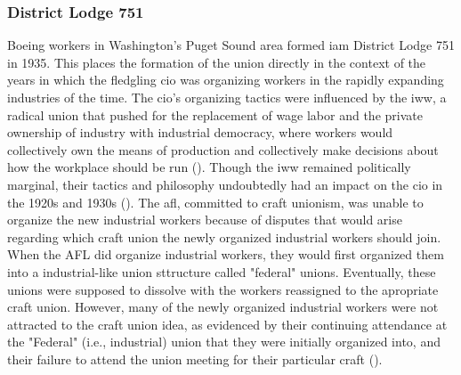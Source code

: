 \documentclass[12pt]{article}
\begin{document}

\subsubsection{District Lodge 751}

Boeing workers in Washington's Puget Sound area formed \acrshort{iam} District Lodge 751 in 1935. This places the formation of the union directly in the context of the years in which the fledgling \acrshort{cio} was organizing workers in the rapidly expanding industries of the time. The \acrshort{cio}'s organizing tactics were influenced by the \acrfull{iww}, a radical union that pushed for the replacement of wage labor and the private ownership of industry with industrial democracy, where workers would collectively own the means of production and collectively make decisions about how the workplace should be run (\cite{industrialworkersoftheworldIWW}). Though the \acrshort{iww} remained politically marginal, their tactics and philosophy undoubtedly had an impact on the \acrshort{cio} in the 1920s and 1930s (\cite[2-6]{mccannBloodWaterHistory1989}). The \acrshort{afl}, committed to craft unionism, was unable to organize the new industrial workers because of disputes that would arise regarding which craft union the newly organized industrial workers should join. When the AFL did organize industrial workers, they would first organized them into a industrial-like union sttructure called "federal" unions. Eventually, these unions were supposed to dissolve with the workers reassigned to the apropriate craft union. However, many of the newly organized industrial workers were not attracted to the craft union idea, as evidenced by their continuing attendance at the "Federal" (i.e., industrial) union that they were initially organized into, and their failure to attend the union meeting for their particular craft (\cite[8]{mccannBloodWaterHistory1989}).
\end{document}
